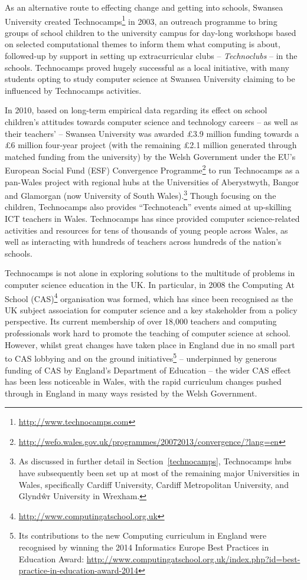 \documentclass{sig-alternate}
\begin{document}
As an alternative route to effecting change and getting into schools,
Swansea University created
Technocamps\footnote{\url{http://www.technocamps.com}} in 2003, an
outreach programme to bring groups of school children to the
university campus for day-long workshops based on selected
computational themes to inform them what computing is about,
followed-up by support in setting up extracurricular clubs --
\emph{Technoclubs} -- in the schools.  Technocamps proved hugely
successful as a local initiative, with many students opting to study
computer science at Swansea University claiming to be influenced by
Technocamps activities.

In 2010, based on long-term empirical data regarding its effect on
school children's attitudes towards computer science and technology
careers -- as well as their teachers' -- Swansea University was
awarded \pounds 3.9 million funding towards a \pounds 6 million
four-year project (with the remaining \pounds 2.1 million generated
through matched funding from the university) by the Welsh Government
under the EU's European Social Fund (ESF) Convergence
Programme\footnote{\url{http://wefo.wales.gov.uk/programmes/20072013/convergence/?lang=en}}
to run Technocamps as a pan-Wales project with regional hubs at the
Universities of Aberystwyth, Bangor and Glamorgan (now University of
South Wales).\footnote{As discussed in further detail in
Section~\ref{technocamps}, Technocamps hubs have subsequently been set
up at most of the remaining major Universities in Wales, specifically
Cardiff University, Cardiff Metropolitan University, and Glynd\^wr
University in Wrexham.}  Though focusing on the children, Technocamps
also provides ``Technoteach'' events aimed at up-skilling ICT teachers
in Wales.  Technocamps has since provided computer science-related
activities and resources for tens of thousands of young people across
Wales, as well as interacting with hundreds of teachers across
hundreds of the nation's schools.

Technocamps is not alone in exploring solutions to the multitude of
problems in computer science education in the UK.  In particular, in
2008 the Computing At School
(CAS)\footnote{\url{http://www.computingatschool.org.uk}} organisation
was formed, which has since been recognised as the UK subject
association for computer science and a key stakeholder from a policy
perspective. Its current membership of over 18,000 teachers and
computing professionals work hard to promote the teaching of computer
science at school. However, whilst great changes have taken place in
England due in no small part to CAS lobbying and on the ground
initiatives\footnote{Its contributions to the new Computing curriculum
in England were recognised by winning the 2014 Informatics Europe Best
Practices in Education
Award: \url{http://www.computingatschool.org.uk/index.php?id=best-practice-in-education-award-2014}}
-- underpinned by generous funding of CAS by England's Department of
Education -- the wider CAS effect has been less noticeable in Wales,
with the rapid curriculum changes pushed through in England in many
ways resisted by the Welsh Government.
\end{document}
